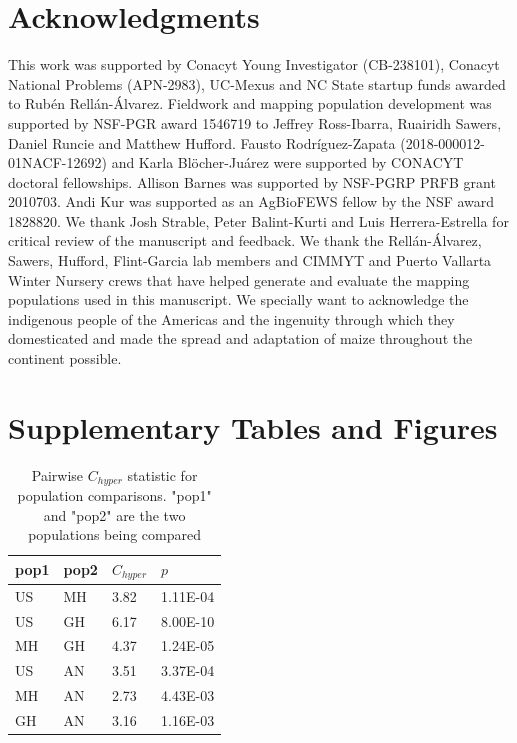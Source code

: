 \documentclass[9pt,twocolumn,twoside,lineno]{biorxiv}
\newcommand{\beginsupplement}{%
        \setcounter{table}{0}
        \renewcommand{\thetable}{S\arabic{table}}%
        \setcounter{figure}{0}
        \renewcommand{\thefigure}{S\arabic{figure}}%
     }
\begin{document}
\section{Acknowledgments}
This work was supported by Conacyt Young Investigator (CB-238101), Conacyt National Problems (APN-2983), UC-Mexus and NC State startup funds awarded to Rub\'en Rellán-Álvarez. 
Fieldwork and mapping population development was supported by NSF-PGR award 1546719 to Jeffrey Ross-Ibarra, Ruairidh Sawers, Daniel Runcie and Matthew Hufford.  
Fausto Rodríguez-Zapata (2018-000012-01NACF-12692) and Karla Blöcher-Juárez were supported by CONACYT doctoral fellowships.
Allison Barnes was supported by NSF-PGRP PRFB grant 2010703. 
Andi Kur was supported as an AgBioFEWS fellow by the NSF award 1828820.
We thank Josh Strable, Peter Balint-Kurti and Luis Herrera-Estrella for critical review of the manuscript and feedback. 
We thank the Rellán-Álvarez, Sawers, Hufford, Flint-Garcia lab members and CIMMYT and Puerto Vallarta Winter Nursery crews that have helped generate and evaluate the mapping populations used in this manuscript.
We specially want to acknowledge the indigenous people of the Americas and the  ingenuity through which they domesticated and made the spread and adaptation of maize throughout the continent possible. 
\label{sec:acknowledgments}

\typeout{}


\clearpage
\beginsupplement

\onecolumn

\section*{Supplementary Tables and Figures}


\begin{table}[h!]

\centering
\begin{tabular}{@{}llll@{}}
\toprule
pop1 & pop2 & $C_{hyper}$   & $p$  \\ \midrule
US   & MH   & 3.82 & 1.11E-04 \\
US   & GH   & 6.17 & 8.00E-10 \\
MH   & GH   & 4.37 & 1.24E-05 \\
US   & AN   & 3.51 & 3.37E-04 \\
MH   & AN   & 2.73 & 4.43E-03 \\
GH   & AN   & 3.16 & 1.16E-03 \\ \bottomrule
\end{tabular}
\label{tab:C_hyper}
\caption{Pairwise $C_{hyper}$ statistic for population comparisons. "pop1" and "pop2" are the two populations being compared}
\end{table}
\end{document}
